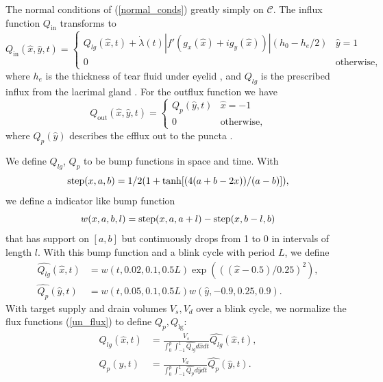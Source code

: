 The normal conditions of (\ref{normal_conds}) greatly simply on $\mathcal{C}$. The influx function $Q_{\text{in}}$ transforms to
\begin{equation}
Q_{\text{in}}(\hat{x},\hat{y},t) = \begin{cases}
Q_{lg}(\hat{x},t) + \dot{\lambda}(t)|f'(g_x(\hat{x})+i g_y(\hat{x}))|(h_0-h_e/2) & \hat{y}=1 \\
0 & \text{otherwise},
\end{cases}
\label{influx_fun}
\end{equation}
where $h_e$ is the thickness of tear fluid under eyelid \cite{heryudono2007single}, and $Q_{lg}$ is the prescribed influx from the lacrimal gland \cite{braun2015dynamics}. For the outflux function we have
\begin{equation}
Q_{\text{out}}(\hat{x},\hat{y},t) = \begin{cases}
Q_{p}(\hat{y},t) & \hat{x}=-1 \\
0 & \text{otherwise},
\end{cases}
\label{out_flux_fun}
\end{equation}
where $Q_{p}(\hat{y})$ describes the efflux out to the puncta \cite{braun2015dynamics}.

We define $Q_{lg}$, $Q_{p}$ to be bump functions in space and time. With
\begin{equation}
\operatorname{step}(x,a,b) = 1/2 (1 + \tanh[(4 (a + b - 2 x))/(a - b)]),
\end{equation}
we define a indicator like bump function
\begin{equation}
w(x,a,b,l) = \operatorname{step}(x,a,a+l)-\operatorname{step}(x,b-l,b)
\end{equation}
that has support on $[a,b]$ but continuously drops from 1 to 0 in intervals of length $l$. With this bump function and a blink cycle with period $L$, we define
\begin{eqnarray}
\hat{Q_{lg}}(\hat{x},t) &= w(t,0.02,0.1,0.5 L) \exp(((\hat{x}-0.5)/0.25)^2), \label{bumb_funs}  \\
\hat{Q_{p}}(\hat{y},t) &= w(t,0.05,0.1,0.5 L) w(\hat{y},-0.9,0.25,0.9). 
\end{eqnarray}
With target supply and drain volumes $V_s, V_d$ over a blink cycle, we normalize the flux functions (\ref{un_flux}) to define $Q_p,Q_{\lg}$:
\begin{eqnarray}
Q_{lg}(\hat{x},t) &= \frac{V_s}{\int_{0}^{p} \int_{-1}^1 \hat{Q_{lg}} d\hat{x} dt} \hat{Q_{lg}}(\hat{x},t), \\
Q_{p}(\hat{y},t) &= \frac{V_d}{\int_{0}^{p} \int_{-1}^1 \hat{Q_{p}} d\hat{y} dt} \hat{Q_{p}}(\hat{y},t).
\label{un_flux}
\end{eqnarray}

